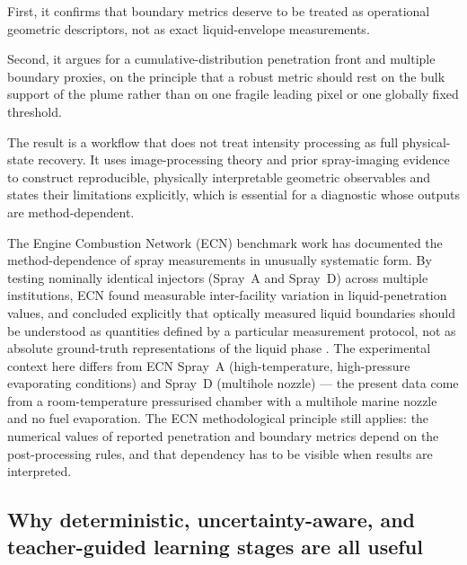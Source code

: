 \documentclass[english, 12pt, a4paper, elec, utf8, a-2b, online]{aaltothesis}
\begin{document}
First, it confirms that boundary metrics deserve to be treated as operational geometric descriptors, not as exact liquid-envelope measurements. 

Second, it argues for a cumulative-distribution penetration front and multiple boundary proxies, 
on the principle that a robust metric should rest on the bulk support of the plume rather than on one fragile leading pixel or one globally fixed threshold.

The result is a workflow that does not treat intensity processing as full physical-state recovery. 
It uses image-processing theory and prior spray-imaging evidence to construct reproducible, 
physically interpretable geometric observables and states their limitations explicitly, 
which is essential for a diagnostic whose outputs are method-dependent.

The Engine Combustion Network (ECN) benchmark work has documented the method-dependence of spray measurements in unusually systematic form. 
By testing nominally identical injectors (Spray~A and Spray~D) across multiple institutions, 
ECN found measurable inter-facility variation in liquid-penetration values, 
and concluded explicitly that optically measured liquid boundaries should be understood as quantities defined by a particular measurement protocol, 
not as absolute ground-truth representations of the liquid phase 
\cite{ecn_liquid_penetration,ecn_liquid_penetration_accessory,MeijerECN2012}. 
The experimental context here differs from ECN Spray~A (high-temperature, high-pressure evaporating conditions) and Spray~D (multihole nozzle) 
--- the present data come from a room-temperature pressurised chamber with a multihole marine nozzle and no fuel evaporation. 
The ECN methodological principle still applies: the numerical values of reported penetration and boundary metrics depend on the post-processing rules, 
and that dependency has to be visible when results are interpreted.

\subsection{Why deterministic, uncertainty-aware, and teacher-guided learning stages are all useful}
\end{document}
